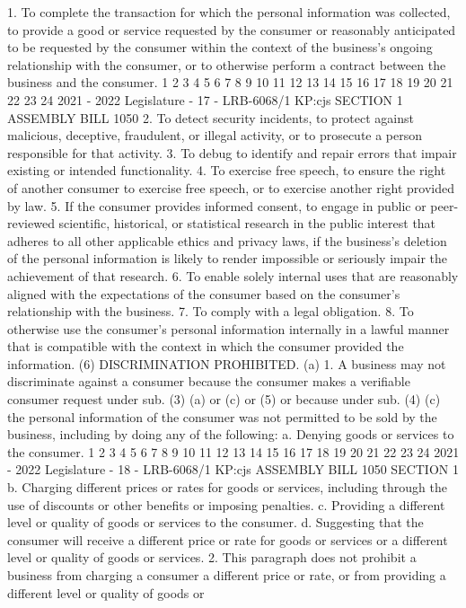 1. To complete the transaction for which the personal information was
collected, to provide a good or service requested by the consumer or reasonably
anticipated to be requested by the consumer within the context of the business's
ongoing relationship with the consumer, or to otherwise perform a contract between
the business and the consumer.
1
2
3
4
5
6
7
8
9
10
11
12
13
14
15
16
17
18
19
20
21
22
23
24
2021 - 2022 Legislature - 17 - LRB-6068/1
KP:cjs
SECTION 1 ASSEMBLY BILL 1050
2. To detect security incidents, to protect against malicious, deceptive,
fraudulent, or illegal activity, or to prosecute a person responsible for that activity.
3. To debug to identify and repair errors that impair existing or intended
functionality.
4. To exercise free speech, to ensure the right of another consumer to exercise
free speech, or to exercise another right provided by law.
5. If the consumer provides informed consent, to engage in public or
peer-reviewed scientific, historical, or statistical research in the public interest that
adheres to all other applicable ethics and privacy laws, if the business's deletion of
the personal information is likely to render impossible or seriously impair the
achievement of that research.
6. To enable solely internal uses that are reasonably aligned with the
expectations of the consumer based on the consumer's relationship with the
business.
7. To comply with a legal obligation.
8. To otherwise use the consumer's personal information internally in a lawful
manner that is compatible with the context in which the consumer provided the
information.
(6) DISCRIMINATION PROHIBITED. (a) 1. A business may not discriminate against
a consumer because the consumer makes a verifiable consumer request under sub.
(3) (a) or (c) or (5) or because under sub. (4) (c) the personal information of the
consumer was not permitted to be sold by the business, including by doing any of the
following:
a. Denying goods or services to the consumer.
1
2
3
4
5
6
7
8
9
10
11
12
13
14
15
16
17
18
19
20
21
22
23
24
2021 - 2022 Legislature - 18 - LRB-6068/1
KP:cjs
 ASSEMBLY BILL 1050 SECTION 1
b. Charging different prices or rates for goods or services, including through the
use of discounts or other benefits or imposing penalties.
c. Providing a different level or quality of goods or services to the consumer.
d. Suggesting that the consumer will receive a different price or rate for goods
or services or a different level or quality of goods or services.
2. This paragraph does not prohibit a business from charging a consumer a
different price or rate, or from providing a different level or quality of goods or
